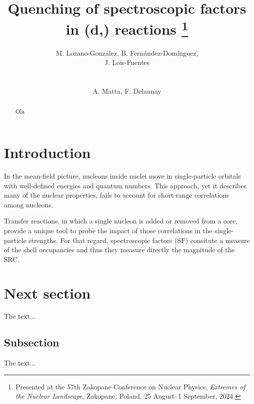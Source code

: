 \documentclass{appolb}
\newcommand{\iso}[2]{\ce{^{#1}#2}}
\begin{document}
\title{Quenching of spectroscopic factors in \iso{10,12}{Be}(d,\iso{3}{He}) reactions %
\thanks{Presented at the 57th Zakopane Conference on Nuclear Physics, {\it Extremes of the Nuclear Landscape}, Zakopane, Poland, 25 August–1 September, 2024.}%
}
\author{M. Lozano-Gonz\'alez, B. Fern\'andez-Dom\'inguez, \\J. Lois-Fuentes
\address{IGFAE and USC}
\\[3mm]
{A. Matta, F. Delaunay %
\address{LPC-Caen}
}
}
\maketitle
\begin{abstract}
    Ola
\end{abstract}
  
\section{Introduction}
In the mean-field picture, nucleons inside nuclei move in single-particle orbitals with well-defined energies and quantum numbers. This approach, yet it describes many of the nuclear properties, fails to account for short-range correlations among nucleons. 

Transfer reactions, in which a single nucleon is added or removed from a core, provide a unique tool to probe the impact of those correlations in the single-particle strengths. For that regard, spectroscopic factors (SF) consitute a measure of the shell occupancies and thus they measure directly the magnitude of the SRC.


\section{Next section}
The text...
\subsection{Subsection}
The text...\cite{lois23}


\printbibliography
\end{document}
